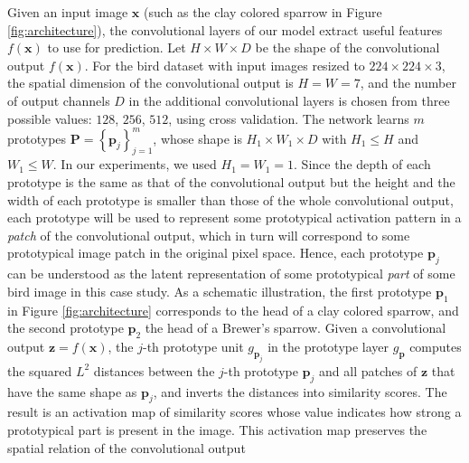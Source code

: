 \documentclass{article}
\theoremstyle{definition}
\theoremstyle{remark}
\begin{document}
Given an input image $\mathbf{x}$ (such as the clay colored sparrow in Figure \ref{fig:architecture}), the convolutional layers of our model extract useful features $f(\mathbf{x})$ to use for prediction. Let $H \times W \times D$ be the shape of the convolutional output $f(\mathbf{x})$. For the bird dataset with input images resized to $224 \times 224 \times 3$, the spatial dimension of the convolutional output is $H = W = 7$, and the number of output channels $D$ in the additional convolutional layers is chosen from three possible values: $128$, $256$, $512$, using cross validation. The network learns $m$ prototypes $\mathbf{P} = \left\{\mathbf{p}_j\right\}_{j=1}^{m}$, whose shape is $H_1 \times W_1 \times D$ with $H_1 \leq H$ and $W_1 \leq W$. In our experiments, we used $H_1 = W_1 = 1$. Since the depth of each prototype is the same as that of the convolutional output but the height and the width of each prototype is smaller than those of the whole convolutional output, each prototype will be used to represent some prototypical activation pattern in a \textit{patch} of the convolutional output, which in turn will correspond to some prototypical image patch in the original pixel space. Hence, each prototype $\mathbf{p}_j$ can be understood as the latent representation of some prototypical \textit{part} of some bird image in this case study. As a schematic illustration, the first prototype $\mathbf{p}_1$ in Figure \ref{fig:architecture} corresponds to the head of a clay colored sparrow, and the second prototype $\mathbf{p}_2$ the head of a Brewer's sparrow. Given a convolutional output $\mathbf{z} = f(\mathbf{x})$, the $j$-th prototype unit $g_{\mathbf{p}_j}$ in the prototype layer $g_{\mathbf{p}}$ computes the squared $L^2$ distances between the $j$-th prototype $\mathbf{p}_j$ and all patches of $\mathbf{z}$ that have the same shape as $\mathbf{p}_j$, and inverts the distances into similarity scores. The result is an activation map of similarity scores whose value indicates how strong a prototypical part is present in the image. This activation map preserves the spatial relation of the convolutional output%
\end{document}
